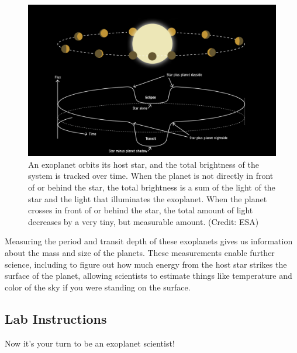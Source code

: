 \documentclass[14pt]{article}
\begin{document}
\newpage

\begin{figure}[ht]
    \centering
    \includegraphics[width=\textwidth]{exo_transit.png}
    \caption{An exoplanet orbits its host star, and the total brightness of the system is tracked over time. When the planet is not directly in front of or behind the star, the total brightness is a sum of the light of the star and the light that illuminates the exoplanet. When the planet crosses in front of or behind the star, the total amount of light decreases by a very tiny, but measurable amount. (Credit: ESA)}
    \label{fig:exo_transit}
\end{figure}


\noindent Measuring the period and transit depth of these exoplanets gives us information about the mass and size of the planets. These measurements enable further science, including to figure out how much energy from the host star strikes the surface of the planet, allowing scientists to estimate things like temperature and color of the sky if you were standing on the surface.

\newpage

\subsection{Lab Instructions}
Now it's your turn to be an exoplanet scientist!
\end{document}
